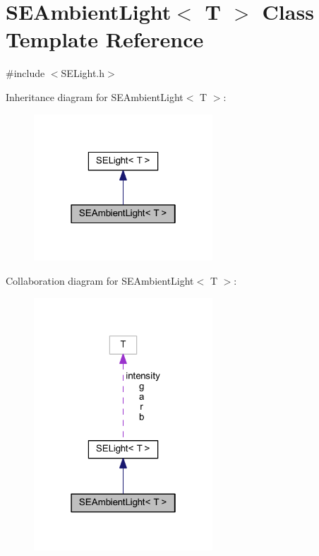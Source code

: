 \section{S\+E\+Ambient\+Light$<$ T $>$ Class Template Reference}
\label{class_s_e_ambient_light}


{\ttfamily \#include $<$S\+E\+Light.\+h$>$}



Inheritance diagram for S\+E\+Ambient\+Light$<$ T $>$\+:
\nopagebreak
\begin{figure}[H]
\begin{center}
\leavevmode
\includegraphics[width=190pt]{class_s_e_ambient_light__inherit__graph}
\end{center}
\end{figure}


Collaboration diagram for S\+E\+Ambient\+Light$<$ T $>$\+:
\nopagebreak
\begin{figure}[H]
\begin{center}
\leavevmode
\includegraphics[width=190pt]{class_s_e_ambient_light__coll__graph}
\end{center}
\end{figure}
